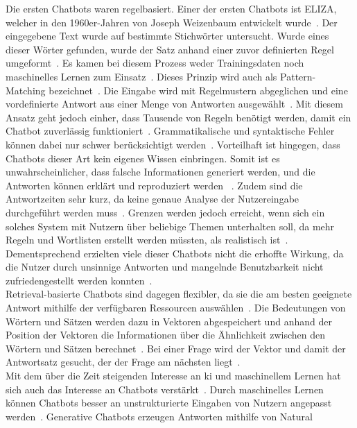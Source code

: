 Die ersten Chatbots waren regelbasiert. Einer der ersten Chatbots ist ELIZA, welcher in den 1960er-Jahren von Joseph Weizenbaum entwickelt 
wurde~\cite[278]{cb02}\cite[99]{cb05}. Der eingegebene Text wurde auf bestimmte Stichwörter untersucht. Wurde eines dieser Wörter gefunden, 
wurde der Satz anhand einer zuvor definierten Regel umgeformt~\cite[37]{cb10}. Es kamen bei diesem Prozess weder Trainingsdaten noch maschinelles Lernen zum 
Einsatz~\cite[100]{cb05}. Dieses Prinzip wird auch als Pattern-Matching bezeichnet~\cite[4]{cb11}. Die Eingabe wird mit Regelmustern abgeglichen und eine vordefinierte
Antwort
aus einer Menge von Antworten ausgewählt~\cite[4]{cb11}. Mit diesem Ansatz geht jedoch einher, dass Tausende von Regeln benötigt werden, damit ein Chatbot zuverlässig
funktioniert~\cite[4\psq]{cb11}. Grammatikalische und syntaktische Fehler können dabei nur schwer berücksichtigt werden~\cite[4\psq]{cb11}. Vorteilhaft ist hingegen, 
dass Chatbots
dieser Art kein eigenes Wissen einbringen. Somit ist es unwahrscheinlicher, dass falsche Informationen generiert werden, und die Antworten können erklärt und reproduziert
werden
~\cite[101]{cb05}. Zudem sind die Antwortzeiten sehr kurz, da keine genaue Analyse der Nutzereingabe durchgeführt werden muss~\cite[5]{cb11}. Grenzen werden 
jedoch erreicht, wenn sich ein solches System mit Nutzern über beliebige Themen unterhalten soll, da mehr Regeln und Wortlisten erstellt werden
müssten, als realistisch ist~\cite[102]{cb05}. Dementsprechend erzielten viele dieser Chatbots nicht die erhoffte Wirkung, da die Nutzer durch unsinnige Antworten und 
mangelnde Benutzbarkeit nicht zufriedengestellt werden konnten~\cite[378]{cb02}. \\
Retrieval-basierte Chatbots sind dagegen flexibler, da sie die am besten geeignete Antwort mithilfe der verfügbaren Ressourcen auswählen~\cite[10]{cb12}. Die 
Bedeutungen von 
Wörtern und Sätzen werden dazu in Vektoren abgespeichert und anhand der Position der Vektoren die Informationen über die Ähnlichkeit zwischen den 
Wörtern und Sätzen berechnet~\cite[103]{cb05}. Bei einer Frage wird der Vektor und damit der Antwortsatz gesucht, der der Frage am nächsten liegt~\cite[103]{cb05}. \\
Mit dem über die Zeit steigenden Interesse an \ac{ki} und maschinellem Lernen hat sich auch das Interesse an Chatbots verstärkt~\cite[379]{cb02}. Durch maschinelles 
Lernen können
Chatbots besser an unstrukturierte Eingaben von Nutzern angepasst werden~\cite[238]{cb03}\cite[6]{cb04}. Generative Chatbots erzeugen Antworten mithilfe von Natural 
